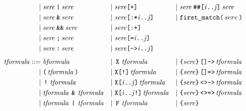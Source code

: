 \documentclass[a4paper,twoside,10pt,DIV=12]{scrreprt}
\DeclareMathOperator{\F}{\texttt{F}}
\DeclareMathOperator{\X}{\texttt{X}}
\newcommand{\StrongX}{\texttt{X[!]}}
\newcommand{\XREP}[1]{\texttt{X[#1]}}
\newcommand{\StrongXREP}[1]{\texttt{X[#1!]}}
\DeclareMathOperator{\NOT}{\texttt{!}}
\newcommand{\OR}{\mathbin{\texttt{|}}}
\newcommand{\AND}{\mathbin{\texttt{\&}}}
\newcommand{\ANDALT}{\mathbin{\texttt{\&\&}}}
\newcommand{\FUSION}{\mathbin{\texttt{:}}}
\newcommand{\CONCAT}{\mathbin{\texttt{;}}}
\newcommand{\DELAYR}[1]{\mathbin{\texttt{\#\#[#1]}}}
\newcommand{\0}{\texttt{0}}
\newcommand{\1}{\texttt{1}}
\newcommand{\FSTAR}[1]{\texttt{[:*#1]}}
\newcommand{\EQUAL}[1]{\texttt{[=#1]}}
\newcommand{\GOTO}[1]{\texttt{[->#1]}}
\newcommand{\PLUS}{\texttt{[+]}}
\newcommand{\FPLUS}{\texttt{[:+]}}
\newcommand{\FIRSTMATCH}{\texttt{first\_match}}
\newcommand{\Esuffix}{\texttt{<>->}}
\newcommand{\Asuffix}{\texttt{[]->}}
\newcommand{\EsuffixEQ}{\texttt{<>=>}}
\newcommand{\AsuffixEQ}{\texttt{[]=>}}
\newcommand\mvar[1]{\ensuremath{\mathit{#1}}}
\newcommand\code[1]{\texttt{#1}}
\newcommand\tsamp[1]{\text{\texttt{#1}}}
\newcommand\msamp[1]{#1}
\begin{document}
\begin{align*}
  \mid{}                    & \mathit{sere}\msamp{\OR}\mathit{sere}                  & \mid{} & \mathit{sere}\msamp{\PLUS}                                 & \mid{} & \mathit{sere}\DELAYR{\mvar{i}..\mvar{j}}\mathit{sere}                    \\
  \mid{}                    & \mathit{sere}\msamp{\AND}\mathit{sere}                 & \mid{} & \mathit{sere}\msamp{\FSTAR{\mvar{i}..\mvar{j}}}            & \mid{} & \FIRSTMATCH\code(\,sere\,\code)                                          \\
  \mid{}                    & \mathit{sere}\msamp{\ANDALT}\mathit{sere}              & \mid{} & \mathit{sere}\msamp{\FPLUS}                                                                                                                    \\
  \mid{}                    & \mathit{sere}\msamp{\CONCAT}\mathit{sere}              & \mid{} & \mathit{sere}\msamp{\EQUAL{\mvar{i}..\mvar{j}}}                                                                                                \\
  \mid{}                    & \mathit{sere}\msamp{\FUSION}\mathit{sere}              & \mid{} & \mathit{sere}\msamp{\GOTO{\mvar{i}..\mvar{j}}}                                                                                                 \\[1ex]
 \mathit{tformula} ::={}    & \mathit{bformula}                                      & \mid{} & \msamp{\X}\,\mathit{tformula}                              & \mid{} & \tsamp{\{}\mathit{sere}\tsamp{\}}\,\msamp{\Asuffix}\,\mathit{tformula}   \\
 \mid{}                     & \tsamp{(}\,\mathit{tformula}\,\tsamp{)}                & \mid{} & \msamp{\StrongX}\,\mathit{tformula}                        & \mid{} & \tsamp{\{}\mathit{sere}\tsamp{\}}\,\msamp{\AsuffixEQ}\,\mathit{tformula} \\
 \mid{}                     & \msamp{\NOT}\,\mathit{tformula}\,                      & \mid{} & \msamp{\XREP{\mvar{i}..\mvar{j}}}\,\mathit{tformula}       & \mid{} & \tsamp{\{}\mathit{sere}\tsamp{\}}\,\msamp{\Esuffix}\,\mathit{tformula}   \\
 \mid{}                     & \mathit{tformula}\,\msamp{\AND}\,\mathit{tformula}     & \mid{} & \msamp{\StrongXREP{\mvar{i}..\mvar{j}}}\,\mathit{tformula} & \mid{} & \tsamp{\{}\mathit{sere}\tsamp{\}}\,\msamp{\EsuffixEQ}\,\mathit{tformula} \\
 \mid{}                     & \mathit{tformula}\,\msamp{\OR}\,\mathit{tformula}      & \mid{} & \msamp{\F}\,\mathit{tformula}                              & \mid{} & \tsamp{\{}\mathit{sere}\tsamp{\}}                                        \\

\end{align*}
\end{document}
